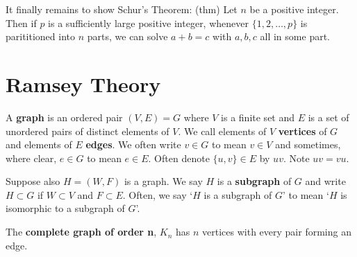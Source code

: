 \documentclass{article}
\begin{document}
It finally remains to show Schur's Theorem:
(thm) Let $n$ be a positive integer. Then if $p$ is a sufficiently large positive integer, whenever $\{1, 2, \dots, p\}$ is parititioned into $n$ parts, we can solve $a + b = c$ with $a, b, c$ all in some part.

\section{Ramsey Theory}

\begin{defi}[Graph]\label{def:graph}\label{def:vertex}\label{def:edge}
    A \textbf{graph} is an ordered pair $(V, E) = G$ where $V$ is a finite set and $E$ is a set of unordered pairs of distinct elements of $V$.  We call elements of $V$ \textbf{vertices} of $G$ and elements of $E$ \textbf{edges}.  We often write $v \in G$ to mean $v \in V$ and sometimes, where clear, $e \in G$ to mean $e \in E$.  Often denote $\{u, v\} \in E$ by $uv$. Note $uv = vu$.
\end{defi}



\begin{defi}[Subgraph]\label{def:subgraph}
    Suppose also $H = (W, F)$ is a graph. We say $H$ is a \textbf{subgraph} of $G$ and write $H \subset G$ if $W \subset V$ and $F \subset E$.  Often, we say `$H$ is a subgraph of $G$' to mean `$H$ is isomorphic to a subgraph of $G$'.
\end{defi}

\begin{defi}\label{def:K_n}
    The \textbf{complete graph of order n}, $K_n$ has $n$ vertices with every pair forming an edge.
\end{defi}
\end{document}
